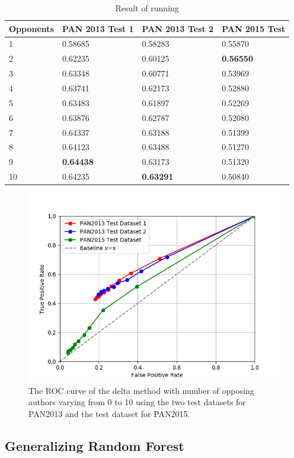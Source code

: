 \begin{table}
    \begin{tabular}{l|lll}
        \textbf{Opponents} & \textbf{PAN 2013 Test 1} & \textbf{PAN 2013 Test 2}
        & \textbf{PAN 2015 Test} \\ \hline
        1  & 0.58685 & 0.58283 & 0.55870 \\
        2  & 0.62235 & 0.60125 & \textbf{0.56550} \\
        3  & 0.63348 & 0.60771 & 0.53969 \\
        4  & 0.63741 & 0.62173 & 0.52880 \\
        5  & 0.63483 & 0.61897 & 0.52269 \\
        6  & 0.63876 & 0.62787 & 0.52080 \\
        7  & 0.64337 & 0.63188 & 0.51399 \\
        8  & 0.64123 & 0.63488 & 0.51270 \\
        9  & \textbf{0.64438} & 0.63173 & 0.51320 \\
        10 & 0.64235 & \textbf{0.63291} & 0.50840
    \end{tabular}
    \caption{Result of running}
    \label{tab:delta_method_final_results}
\end{table}

\begin{figure}
    \centering
    \includegraphics[width=.7\textwidth]{./pictures/delta_method_roc.png}
    \caption{The ROC curve of the delta method with number of opposing authors
    varying from 0 to 10 using the two test datasets for PAN2013 and the test
    dataset for PAN2015.}
    \label{fig:delta_method_roc}
\end{figure}

\subsection{Generalizing Random Forest}

